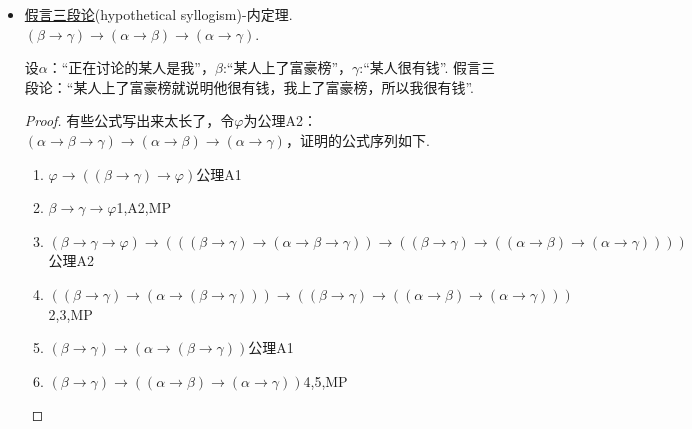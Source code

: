 \begin{itemize}
    \item \underline{假言三段论}(hypothetical syllogism)-内定理. \((\beta \to \gamma) \to (\alpha \to \beta) \to (\alpha \to \gamma)\).
    \begin{note}
        设\(\alpha\)：“正在讨论的某人是我”，\(\beta\):“某人上了富豪榜”，\(\gamma\):“某人很有钱”. 假言三段论：“某人上了富豪榜就说明他很有钱，我上了富豪榜，所以我很有钱”.
    \end{note}
    \begin{proof}
        有些公式写出来太长了，令\(\varphi\)为公理A2：\((\alpha \to \beta \to \gamma) \to (\alpha \to \beta) \to (\alpha \to \gamma)\)，证明的公式序列如下.
        \begin{enumerate}
            \item \(\varphi \to ((\beta \to \gamma) \to \varphi)\)\hfill 公理A1
            \item \(\beta \to \gamma \to \varphi\)\hfill 1,A2,MP
            \item \((\beta \to \gamma \to \varphi) \to (((\beta \to \gamma) \to (\alpha \to \beta \to \gamma)) \to ((\beta \to \gamma) \to ((\alpha \to \beta) \to (\alpha \to \gamma))))\)\hfill 公理A2
            \item \(((\beta \to \gamma) \to (\alpha \to (\beta \to \gamma))) \to ((\beta \to \gamma) \to ((\alpha \to \beta) \to (\alpha \to \gamma)))\)\hfill 2,3,MP 
            \item \((\beta \to \gamma) \to (\alpha \to (\beta \to \gamma))\)\hfill 公理A1 
            \item \((\beta \to \gamma) \to ((\alpha \to \beta) \to (\alpha \to \gamma))\)\hfill 4,5,MP 
        \end{enumerate}
    \end{proof}


\end{itemize}
